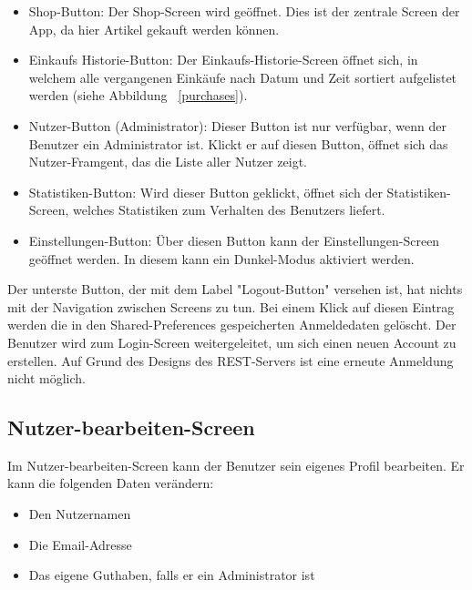 \begin{itemize}
	\item Shop-Button: Der Shop-Screen wird geöffnet.
	Dies ist der zentrale Screen der App, da hier Artikel gekauft werden können.

	\item Einkaufs Historie-Button: Der Einkaufs-Historie-Screen öffnet sich, in welchem alle vergangenen Einkäufe nach Datum und Zeit sortiert aufgelistet werden (siehe Abbildung ~\ref{purchases}).

	\item Nutzer-Button (Administrator): Dieser Button ist nur verfügbar, wenn der Benutzer ein Administrator ist.
	Klickt er auf diesen Button, öffnet sich das Nutzer-Framgent, das die Liste aller Nutzer zeigt.

	\item Statistiken-Button: Wird dieser Button geklickt, öffnet sich der Statistiken-Screen, welches Statistiken zum Verhalten des Benutzers liefert.

	\item Einstellungen-Button: Über diesen Button kann der Einstellungen-Screen geöffnet werden.
	In diesem kann ein Dunkel-Modus aktiviert werden.

\end{itemize}

Der unterste Button, der mit dem Label "Logout-Button" versehen ist, hat nichts mit der Navigation zwischen Screens zu tun.
Bei einem Klick auf diesen Eintrag werden die in den Shared-Preferences gespeicherten Anmeldedaten gelöscht.
Der Benutzer wird zum Login-Screen weitergeleitet, um sich einen neuen Account zu erstellen.
Auf Grund des Designs des REST-Servers ist eine erneute Anmeldung nicht möglich.

\subsection{Nutzer-bearbeiten-Screen} \label{subsec:edit-user-screen}

Im Nutzer-bearbeiten-Screen kann der Benutzer sein eigenes Profil bearbeiten.
Er kann die folgenden Daten verändern:

\begin{itemize}
	\item Den Nutzernamen
	\item Die Email-Adresse
	\item Das eigene Guthaben, falls er ein Administrator ist
\end{itemize}

